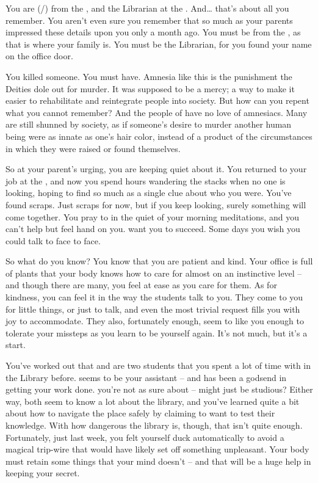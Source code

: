 \documentclass[char]{GL2020}
\begin{document}
\name{\cLibrarian{}}

You are \cLibrarian{\full} (\cLibrarian{\they}/\cLibrarian{\them}) from the \pTech{}, and the Librarian at the \pSchool{}. And\ldots{} that's about all you remember. You aren't even sure you remember that so much as your parents impressed these details upon you only a month ago. You must be from the \pTech{}, as that is where your family is. You must be the Librarian, for you found your name on the office door.

You killed someone. You must have. Amnesia like this is the punishment the Deities dole out for murder. It was supposed to be a mercy; a way to make it easier to rehabilitate and reintegrate people into society. But how can you repent what you cannot remember? And the people of \pEarth{} have no love of amnesiacs. Many are still shunned by society, as if someone's desire to murder another human being were as innate as one's hair color, instead of a product of the circumstances in which they were raised or found themselves.

So at your parent's urging, you are keeping quiet about it. You returned to your job at the \pSchool{}, and now you spend hours wandering the stacks when no one is looking, hoping to find so much as a single clue about who you were. You've found scraps. Just scraps for now, but if you keep looking, surely something will come together. You pray to \cTechGod{} in the quiet of your morning meditations, and you can't help but feel \cTechGod{\their} hand on you. \cTechGod{\They} want you to succeed. Some days you wish you could talk to \cTechGod{\them} face to face.

So what do you know? You know that you are patient and kind. Your office is full of plants that your body knows how to care for almost on an instinctive level -- and though there are many, you feel at ease as you care for them. As for kindness, you can feel it in the way the students talk to you. They come to you for little things, or just to talk, and even the most trivial request fills you with joy to accommodate. They also, fortunately enough, seem to like you enough to tolerate your missteps as you learn to be yourself again. It's not much, but it's a start.

You've worked out that \cPresident{\full} and \cLibAssist{\full} are two students that you spent a lot of time with in the Library before. \cLibAssist{} seems to be your assistant -- and has been a godsend in getting your work done. \cPresident{} you're not as sure about -- \cPresident{\they} might just be studious? Either way, both seem to know a lot about the library, and you've learned quite a bit about how to navigate the place safely by claiming to want to test their knowledge. With how dangerous the library is, though, that isn't quite enough. Fortunately, just last week, you felt yourself duck automatically to avoid a magical trip-wire that would have likely set off something unpleasant. Your body must retain some things that your mind doesn't -- and that will be a huge help in keeping your secret.
\end{document}
